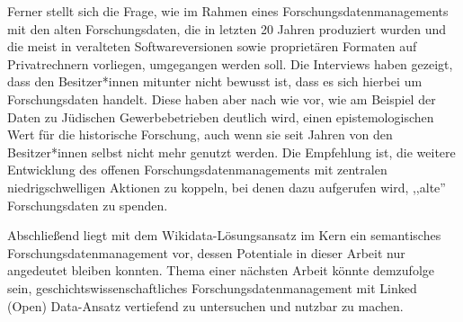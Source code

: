 Ferner stellt sich die Frage, wie im Rahmen eines Forschungsdatenmanagements mit den alten Forschungsdaten, die in letzten 20 Jahren produziert wurden und die meist in veralteten Softwareversionen sowie proprietären Formaten auf Privatrechnern vorliegen, umgegangen werden soll. Die Interviews haben gezeigt, dass den Besitzer*innen mitunter nicht bewusst ist, dass es sich hierbei um Forschungsdaten handelt. Diese haben aber nach wie vor, wie am Beispiel der Daten zu Jüdischen Gewerbebetrieben deutlich wird, einen epistemologischen Wert für die historische Forschung, auch wenn sie seit Jahren von den Besitzer*innen selbst nicht mehr genutzt werden. Die Empfehlung ist, die weitere Entwicklung des offenen Forschungsdatenmanagements mit zentralen niedrigschwelligen Aktionen zu koppeln, bei denen dazu aufgerufen wird, ,,alte'' Forschungsdaten zu spenden.

Abschließend liegt mit dem Wikidata-Lösungsansatz im Kern ein semantisches Forschungsdatenmanagement vor, dessen Potentiale in dieser Arbeit nur angedeutet bleiben konnten. Thema einer nächsten Arbeit könnte demzufolge sein, geschichtswissenschaftliches Forschungsdatenmanagement mit Linked (Open) Data-Ansatz vertiefend zu untersuchen und nutzbar zu machen.
 